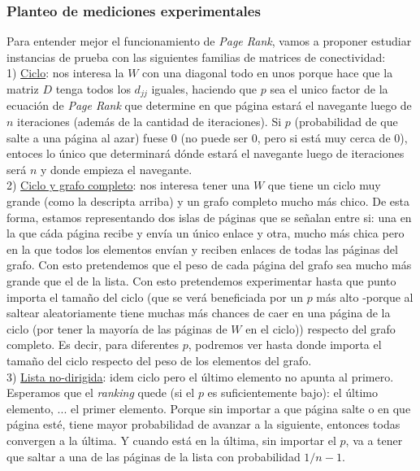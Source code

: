 		\subsubsection{Planteo de mediciones experimentales}

			Para entender mejor el funcionamiento de \textit{Page Rank}, vamos a proponer estudiar instancias de prueba con las siguientes familias de matrices de conectividad:\\

			1) \underline{Ciclo}: nos interesa la $W$ con una diagonal todo en unos porque hace que la matriz $D$ tenga todos los $d_{jj}$ iguales, haciendo que $p$ sea el unico factor de la ecuación de \textit{Page Rank} que determine en que página estará el navegante luego de $n$ iteraciones (además de la cantidad de iteraciones). Si $p$ (probabilidad de que salte a una página al azar) fuese $0$ (no puede ser $0$, pero si está muy cerca de $0$), entoces lo único que determinará dónde estará el navegante luego de iteraciones será $n$ y donde empieza el navegante. \\

			2) \underline{Ciclo y grafo completo}: nos interesa tener una $W$ que tiene un ciclo muy grande (como la descripta arriba) y un grafo completo mucho más chico. De esta forma, estamos representando dos islas de páginas que se señalan entre si: una en la que cáda página recibe y envía un único enlace y otra, mucho más chica pero en la que todos los elementos envían y reciben enlaces de todas las páginas del grafo. Con esto pretendemos que el peso de cada página del grafo sea mucho más grande que el de la lista. Con esto pretendemos experimentar hasta que punto importa el tamaño del ciclo (que se verá beneficiada por un $p$ más alto -porque al saltear aleatoriamente tiene muchas más chances de caer en una página de la ciclo (por tener la mayoría de las páginas de $W$ en el ciclo)) respecto del grafo completo. Es decir, para diferentes $p$, podremos ver hasta donde importa el tamaño del ciclo respecto del peso de los elementos del grafo. \\

			3) \underline{Lista no-dirigida}: idem ciclo pero el último elemento no apunta al primero. Esperamos que el \textit{ranking} quede (si el $p$ es suficientemente bajo): el último elemento, ... el primer elemento. Porque sin importar a que página salte o en que página esté, tiene mayor probabilidad de avanzar a la siguiente, entonces todas convergen a la última. Y cuando está en la última, sin importar el $p$, va a tener que saltar a una de las páginas de la lista con probabilidad $1/n-1$.\\

